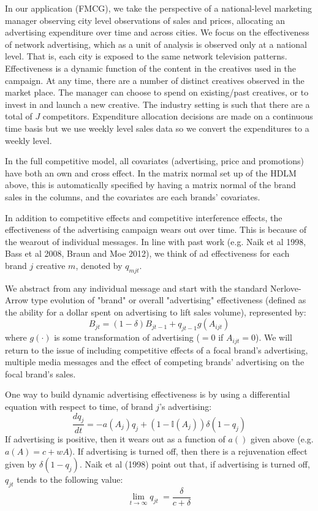 \documentclass[letter,10pt]{article}
\newcommand{\Igtz}{\mathbb{I}}
\begin{document}
In our application (FMCG), we take the perspective of a national-level marketing manager observing city  
level observations of sales and prices, allocating an advertising expenditure over time and across cities.  
We focus on the effectiveness of network advertising, which as a unit of analysis is observed only at a national level.
That is, each city is exposed to the same network television patterns.  Effectiveness is a dynamic function of 
the content in the creatives used in the campaign.  At any time, there are a number of distinct creatives
observed in the market place.  The manager can choose to spend on existing/past creatives, or to invest in 
and launch a new creative.  The industry setting is such that there 
are a total of $J$ competitors.  Expenditure allocation decisions are made on a continuous time basis but 
we use weekly level sales data so we convert the expenditures to a weekly level.  

In the full competitive model, all covariates (advertising, price and promotions) have both an own
and cross effect.   In the matrix normal set up of
the HDLM above, this is automatically specified by having a matrix normal of the brand sales in the columns,
and the covariates are each brands' covariates.  

In addition to competitive effects and competitive interference effects, the effectiveness of
the advertising campaign wears out over time.  This is because of the wearout of individual messages.  
In line with past work (e.g. Naik et al 1998,  Bass et al 2008, Braun and Moe 2012), we think 
of ad effectiveness for each brand $j$ creative $m$, denoted by $q_{mjt}$.  

We abstract from any individual message and 
start with the standard Nerlove-Arrow type evolution of "brand" or overall "advertising"
effectiveness (defined as the ability for a dollar spent on advertising to lift sales volume), represented by:
\begin{equation}
\label{eqn:bqj1}
B_{jt} = (1-\delta) B_{jt-1} + q_{jt-1} g(A_{ijt})  
\end{equation}
where $g(\cdot)$ is some transformation of advertising ($=0$ if
$A_{ijt}=0$).
We will return to the issue of including competitive effects of a focal brand's advertising, multiple media messages
and the effect of competing brands' advertising on the focal brand's sales. 

One way to build dynamic advertising effectiveness is by using a differential equation with respect
to time, of brand $j$'s advertising:
\[
\frac{dq_j}{dt} = -a(A_j)q_j +(1-\Igtz(A_j)) \delta (1 - q_j) 
\]
If advertising is positive, then it wears out as a function of $a()$ given above (e.g. $a(A) = c + wA$).  
If advertising is turned off, then there is a rejuvenation effect given by $\delta (1 - q_j)$. 
Naik et al (1998) point out that, if advertising is turned off, $q_{jt}$ tends to the following value:
\[
\lim_{t \rightarrow \infty} q_{jt} ~=  \frac{\delta}{c+\delta}
\]
\end{document}
